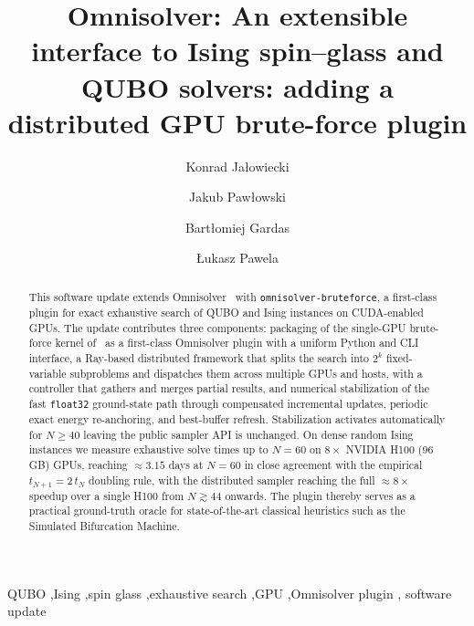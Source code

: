 \documentclass[preprint,12pt,a4paper]{elsarticle}
\begin{document}
\begin{frontmatter}

\title{Omnisolver: An extensible interface to Ising spin--glass and QUBO solvers: adding a distributed GPU brute-force plugin}

\author[1]{Konrad Ja\l{}owiecki}
\author[2,3]{Jakub Paw{\l}owski}
\author[1,2]{Bart{\l}omiej Gardas}
\author[1,2]{{\L}ukasz Pawela}

\address[1]{Institute of Theoretical and Applied Informatics, Polish Academy
of Sciences, Ba{\l}tycka 5, 44-100 Gliwice, Poland}

\address[2]{Quantumz.io Sp. z o. o., Pu{\l}awska 12/3, 02-566 Warsaw, Poland}

\address[3]{Institute of Theoretical Physics, Faculty of Fundamental Problems
of Technology, Wroc{\l}aw University of Science and Technology,
50-370 Wroc{\l}aw, Poland}

\begin{abstract}
This software update extends
Omnisolver~\cite{jalowiecki2021omnisolver} with
\texttt{omnisolver-bruteforce}, a first-class plugin for exact exhaustive
search of QUBO and Ising instances on CUDA-enabled GPUs. The update
contributes three components: packaging of the single-GPU brute-force
kernel of~\cite{jalowiecki2021brute} as a first-class Omnisolver plugin
with a uniform Python and
CLI interface, a Ray-based distributed framework that splits the search
into $2^{k}$ fixed-variable subproblems and dispatches them across multiple
GPUs and hosts, with a controller that gathers and merges partial results,
and numerical stabilization of the fast \texttt{float32} ground-state
path through compensated incremental updates, periodic exact energy
re-anchoring, and best-buffer refresh. Stabilization activates automatically
for $N \geq 40$ leaving the public sampler API is unchanged. On dense random Ising
instances we measure exhaustive solve times up to $N=60$ on $8\times$ NVIDIA
H100 (96\,GB) GPUs, reaching $\approx\!3.15$ days at $N=60$ in close
agreement with the empirical $t_{N+1}=2\,t_N$ doubling rule, with the
distributed sampler reaching the full $\approx\!8\times$ speedup over a
single H100 from $N\!\gtrsim\!44$ onwards. The plugin thereby serves as a
practical ground-truth oracle for state-of-the-art classical heuristics such
as the Simulated Bifurcation Machine.
\end{abstract}

\begin{keyword}
QUBO \sep Ising \sep spin glass \sep exhaustive search \sep GPU \sep Omnisolver plugin \sep
software update
\end{keyword}

\end{frontmatter}
\end{document}
